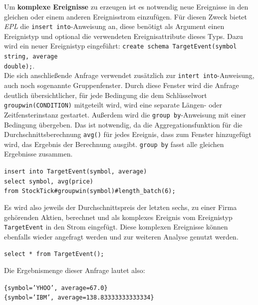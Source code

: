 \documentclass{acm_proc_article-sp}
\begin{document}
Um \textbf{komplexe Ereignisse} zu erzeugen ist es notwendig neue Ereignisse in den 
gleichen oder einem anderen Ereignisstrom einzufügen. Für diesen Zweck bietet 
\textit{EPL} die 
\texttt{insert into}-Anweisung an, diese benötigt als Argument einen Ereignistyp und 
optional die verwendeten Ereignisattribute dieses Typs. Dazu wird ein neuer Ereignistyp 
eingeführt: \texttt{create schema TargetEvent(symbol string, average\\ double);}.\\
Die sich anschließende Anfrage verwendet zusätzlich zur \texttt{intert into}-Anweisung, 
auch noch sogenannte Gruppenfenster. Durch diese Fenster wird die Anfrage deutlich 
übersichtlicher, für jede Bedingung die dem Schlüsselwort \texttt{groupwin(CONDITION)} 
mitgeteilt wird, wird eine separate Längen- oder Zeitfensterinstanz gestartet. Außerdem 
wird die \texttt{group by}-Anweisung mit einer Bedingung übergeben. Das ist notwendig, da 
die Aggregationsfunktion für die Durchschnittsberechnung \texttt{avg()} für jedes 
Ereignis, dass zum Fenster hinzugefügt wird, das Ergebnis der Berechnung ausgibt. 
\texttt{group by} fasst alle gleichen Ergebnisse zusammen.

\texttt{insert into TargetEvent(symbol, average)\\
select symbol, avg(price)\\
from StockTick\#groupwin(symbol)\#length\_batch(6);}

Es wird also jeweils der Durchschnittspreis der letzten sechs, zu einer Firma gehörenden 
Aktien, berechnet und als komplexes Ereignis vom Ereignistyp \texttt{TargetEvent} in den 
Strom eingefügt. Diese komplexen Ereignisse können ebenfalls wieder angefragt werden und 
zur weiteren Analyse genutzt werden.

\texttt{select  * from TargetEvent();} 

Die Ergebnismenge dieser Anfrage lautet also:

\texttt{\{symbol='YHOO', average=67.0\}}\\
\texttt{\{symbol='IBM', average=138.83333333333334\}}
\end{document}
